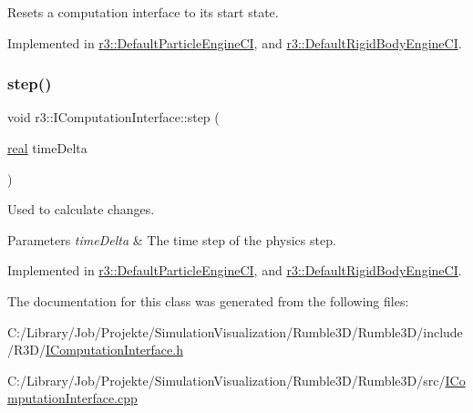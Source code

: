 Resets a computation interface to its start state. 



Implemented in \mbox{\hyperlink{classr3_1_1_default_particle_engine_c_i_a97757c62b4cb1266da29e2b5625bb9d3}{r3\+::\+Default\+Particle\+Engine\+CI}}, and \mbox{\hyperlink{classr3_1_1_default_rigid_body_engine_c_i_a06bd27e94b26017e7960e01f6e884e33}{r3\+::\+Default\+Rigid\+Body\+Engine\+CI}}.

\mbox{\label{classr3_1_1_i_computation_interface_aaa12bcc35005f32a1984b38de97696cb}} 
\subsubsection{\texorpdfstring{step()}{step()}}
{\footnotesize\ttfamily void r3\+::\+I\+Computation\+Interface\+::step (\begin{DoxyParamCaption}\item[{\mbox{\hyperlink{namespacer3_ab2016b3e3f743fb735afce242f0dc1eb}{real}}}]{time\+Delta }\end{DoxyParamCaption})\hspace{0.3cm}{\ttfamily [pure virtual]}}



Used to calculate changes. 


\begin{DoxyParams}{Parameters}
{\em time\+Delta} & The time step of the physics step. \\
\hline
\end{DoxyParams}


Implemented in \mbox{\hyperlink{classr3_1_1_default_particle_engine_c_i_a7c58fd00ec521410e1b412e9885ee0d2}{r3\+::\+Default\+Particle\+Engine\+CI}}, and \mbox{\hyperlink{classr3_1_1_default_rigid_body_engine_c_i_ac45ae1d1889c75e6839b865870cbf59c}{r3\+::\+Default\+Rigid\+Body\+Engine\+CI}}.



The documentation for this class was generated from the following files\+:\begin{DoxyCompactItemize}
\item 
C\+:/\+Library/\+Job/\+Projekte/\+Simulation\+Visualization/\+Rumble3\+D/\+Rumble3\+D/include/\+R3\+D/\mbox{\hyperlink{_i_computation_interface_8h}{I\+Computation\+Interface.\+h}}\item 
C\+:/\+Library/\+Job/\+Projekte/\+Simulation\+Visualization/\+Rumble3\+D/\+Rumble3\+D/src/\mbox{\hyperlink{_i_computation_interface_8cpp}{I\+Computation\+Interface.\+cpp}}\end{DoxyCompactItemize}
